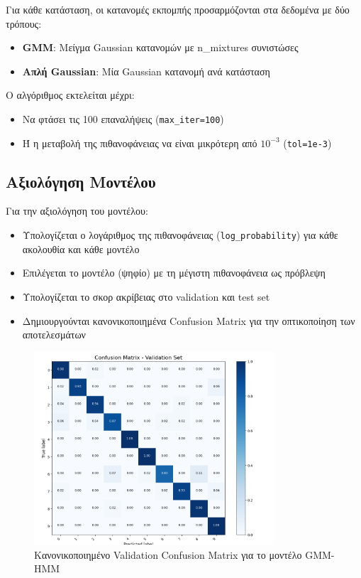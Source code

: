 \documentclass[a4paper,12pt]{article}
\begin{document}
Για κάθε κατάσταση, οι κατανομές εκπομπής προσαρμόζονται στα δεδομένα με δύο τρόπους:
\begin{itemize}
    \item \textbf{GMM}: Μείγμα Gaussian κατανομών με n\_mixtures συνιστώσες
    \item \textbf{Απλή Gaussian}: Μία Gaussian κατανομή ανά κατάσταση
\end{itemize}

Ο αλγόριθμος εκτελείται μέχρι:
\begin{itemize}
    \item Να φτάσει τις 100 επαναλήψεις (\texttt{max\_iter=100})
    \item Ή η μεταβολή της πιθανοφάνειας να είναι μικρότερη από $10^{-3}$ (\texttt{tol=1e-3})
\end{itemize}

\subsection*{Αξιολόγηση Μοντέλου}
Για την αξιολόγηση του μοντέλου:
\begin{itemize}
    \item Υπολογίζεται ο λογάριθμος της πιθανοφάνειας (\texttt{log\_probability}) για κάθε ακολουθία και κάθε μοντέλο
    \item Επιλέγεται το μοντέλο (ψηφίο) με τη μέγιστη πιθανοφάνεια ως πρόβλεψη
    \item Υπολογίζεται το σκορ ακρίβειας στο validation και test set
    \item Δημιουργούνται κανονικοποιημένα Confusion Matrix για την οπτικοποίηση των αποτελεσμάτων
\end{itemize}

\begin{figure}[h]
    \centering
    \includegraphics[width=0.8\textwidth]{hmm_val_cm.png}
    \caption{Κανονικοποιημένο Validation Confusion Matrix για το μοντέλο GMM-HMM}
    \label{fig:hmm_val_confusion_matrix}
\end{figure}
\end{document}
